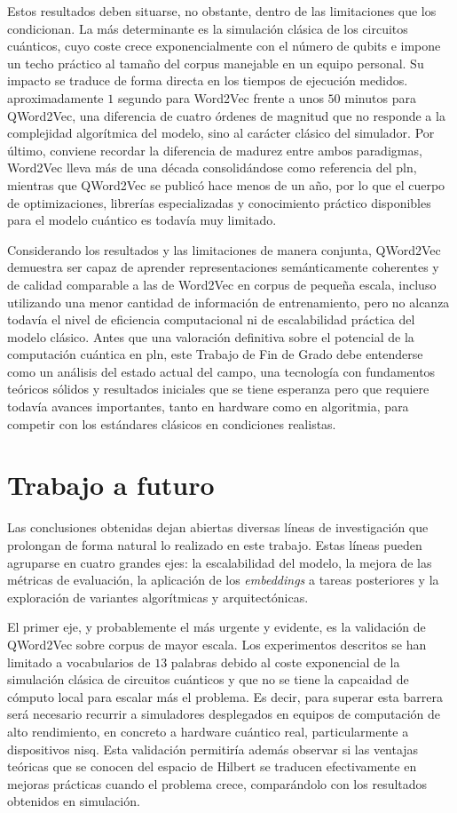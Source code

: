 Estos resultados deben situarse, no obstante, dentro de las limitaciones que los condicionan. La más determinante es la simulación clásica de los circuitos cuánticos, cuyo coste crece exponencialmente con el número de qubits e impone un techo práctico al tamaño del corpus manejable en un equipo personal. Su impacto se traduce de forma directa en los tiempos de ejecución medidos. aproximadamente $1$ segundo para Word2Vec frente a unos $50$ minutos para QWord2Vec, una diferencia de cuatro órdenes de magnitud que no responde a la complejidad algorítmica del modelo, sino al carácter clásico del simulador. Por último, conviene recordar la diferencia de madurez entre ambos paradigmas, Word2Vec lleva más de una década consolidándose como referencia del \gls{pln}, mientras que QWord2Vec se publicó hace menos de un año, por lo que el cuerpo de optimizaciones, librerías especializadas y conocimiento práctico disponibles para el modelo cuántico es todavía muy limitado.

Considerando los resultados y las limitaciones de manera conjunta, QWord2Vec demuestra ser capaz de aprender representaciones semánticamente coherentes y de calidad comparable a las de Word2Vec en corpus de pequeña escala, incluso utilizando una menor cantidad de información de entrenamiento, pero no alcanza todavía el nivel de eficiencia computacional ni de escalabilidad práctica del modelo clásico. Antes que una valoración definitiva sobre el potencial de la computación cuántica en \gls{pln}, este Trabajo de Fin de Grado debe entenderse como un análisis del estado actual del campo, una tecnología con fundamentos teóricos sólidos y resultados iniciales que se tiene esperanza pero que requiere todavía avances importantes, tanto en hardware como en algoritmia, para competir con los estándares clásicos en condiciones realistas.


\section{Trabajo a futuro}

Las conclusiones obtenidas dejan abiertas diversas líneas de investigación que prolongan de forma natural lo realizado en este trabajo. Estas líneas pueden agruparse en cuatro grandes ejes: la escalabilidad del modelo, la mejora de las métricas de evaluación, la aplicación de los \textit{embeddings} a tareas posteriores y la exploración de variantes algorítmicas y arquitectónicas.

El primer eje, y probablemente el más urgente y evidente, es la validación de QWord2Vec sobre corpus de mayor escala. Los experimentos descritos se han limitado a vocabularios de $13$ palabras debido al coste exponencial de la simulación clásica de circuitos cuánticos y que no se tiene la capcaidad de cómputo local para escalar más el problema. Es decir, para superar esta barrera será necesario recurrir a simuladores desplegados en equipos de computación de alto rendimiento, en concreto a hardware cuántico real, particularmente a dispositivos \gls{nisq}. Esta validación permitiría además observar si las ventajas teóricas que se conocen del espacio de Hilbert se traducen efectivamente en mejoras prácticas cuando el problema crece, comparándolo con los resultados obtenidos en simulación.

